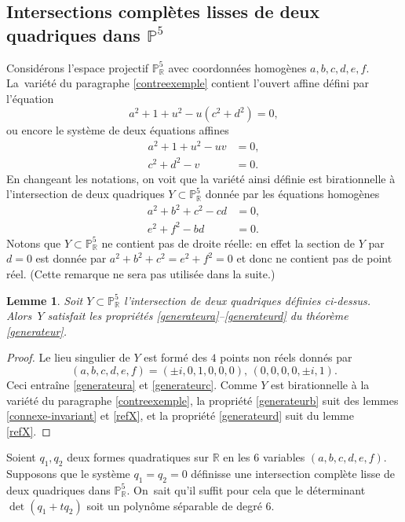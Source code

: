 \documentclass[JEP,XML,SOM,Unicode,francais,published]{cedram}
\newtheorem{lemma}[thm]{Lemme}
\theoremstyle{definition}
\newcommand{\R}{\mathbb R}
\renewcommand{\P}{\mathbb P}
\newcommand{\on}[1]{\operatorname{#1}}
\begin{document}
\subsection{Intersections complètes lisses de deux quadriques dans \texorpdfstring{$\P^5$}{P5}}
Considérons l'espace projectif $\P^5_\R$ avec coordonnées homogènes $a,b,c,d,e,f$. La~variété du paragraphe \ref{contreexemple} contient l'ouvert affine défini par l'équation
\[a^2+1+u^2 - u (c^2+d^2)=0,\]
ou encore le système de deux équations affines
\begin{align*}
a^2+1+u^2 -uv &=0, \\
c^2+d^2-v&=0.
\end{align*}
En changeant les notations, on voit que
la variété ainsi définie est birationnelle
à l'intersection de
deux quadriques $Y\subset \P^5_{\R}$
donnée par les équations homogènes
\begin{align*}
a^2+ b^2+c^2 - cd&=0,\\
e^2+f^2-bd&= 0.
\end{align*}
Notons que $Y \subset \P^5_\R$ ne contient pas de droite réelle: en effet la section de $Y$ par $d=0$ est donnée par $a^2+ b^2+c^2=e^2+f^2=0$ et donc ne contient pas de point réel. (Cette remarque ne sera pas utilisée dans la suite.)

\begin{lemma}\label{speciale-int-quadriques}
Soit $Y\subset \P^5_\R$ l'intersection de deux quadriques définies ci-dessus. Alors~$Y$ satisfait les propriétés \eqref{generateura}--\eqref{generateurd} du théorème \ref{generateur}.
\end{lemma}

\begin{proof}
Le lieu singulier de $Y$ est formé des $4$ points non réels donnés par
\[
(a,b,c,d,e,f)= (\pm i, 0, 1,0,0,0),\, (0,0,0,0,\pm i, 1).
\]
Ceci entraîne \eqref{generateura} et \eqref{generateurc}. Comme $Y$ est birationnelle à la variété du paragraphe \ref{contreexemple}, la propriété \eqref{generateurb} suit des lemmes \ref{connexe-invariant} et \ref{refX}, et la propriété \eqref{generateurd} suit du lemme \ref{refX}.
\end{proof}

Soient $q_1, q_2$ deux formes quadratiques sur $\R$ en les 6 variables $(a,b,c,d,e,f)$. Supposons
que le système $q_1=q_2=0$ définisse une intersection complète lisse de deux quadriques dans $\P^5_{\R}$. On~sait qu'il suffit pour cela que le déterminant $\on{det}(q_1+tq_2)$ soit un polynôme séparable de degré $6$.
\end{document}
